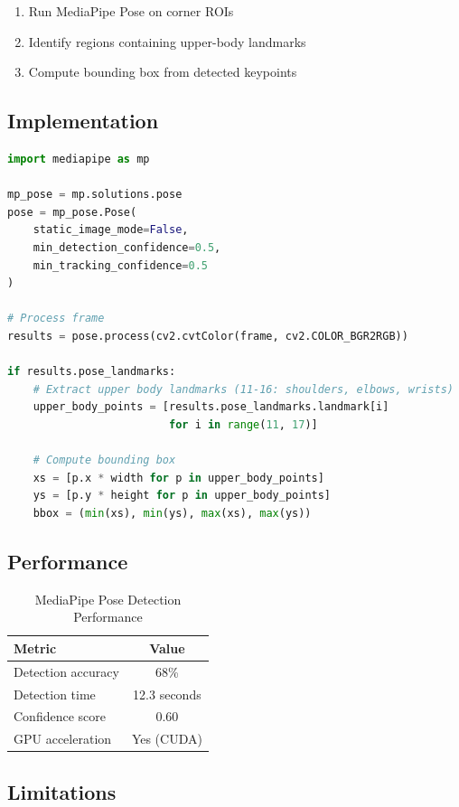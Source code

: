 \documentclass[11pt,a4paper]{article}
\begin{document}
\begin{enumerate}
    \item Run MediaPipe Pose on corner ROIs
    \item Identify regions containing upper-body landmarks
    \item Compute bounding box from detected keypoints
\end{enumerate}

\subsection{Implementation}

\begin{lstlisting}[language=Python]
import mediapipe as mp

mp_pose = mp.solutions.pose
pose = mp_pose.Pose(
    static_image_mode=False,
    min_detection_confidence=0.5,
    min_tracking_confidence=0.5
)

# Process frame
results = pose.process(cv2.cvtColor(frame, cv2.COLOR_BGR2RGB))

if results.pose_landmarks:
    # Extract upper body landmarks (11-16: shoulders, elbows, wrists)
    upper_body_points = [results.pose_landmarks.landmark[i] 
                         for i in range(11, 17)]
    
    # Compute bounding box
    xs = [p.x * width for p in upper_body_points]
    ys = [p.y * height for p in upper_body_points]
    bbox = (min(xs), min(ys), max(xs), max(ys))
\end{lstlisting}

\subsection{Performance}

\begin{table}[htbp]
\centering
\caption{MediaPipe Pose Detection Performance}
\begin{tabular}{@{}lc@{}}
\toprule
\textbf{Metric} & \textbf{Value} \\ \midrule
Detection accuracy & 68\% \\
Detection time & 12.3 seconds \\
Confidence score & 0.60 \\
GPU acceleration & Yes (CUDA) \\
\bottomrule
\end{tabular}
\end{table}

\subsection{Limitations}
\end{document}
